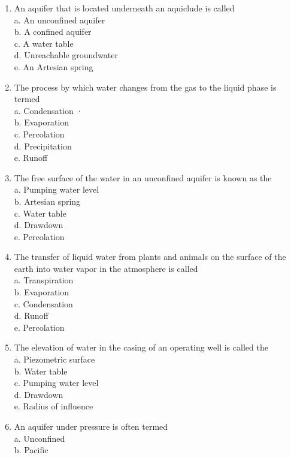 \begin{enumerate}[1.]
 \item An aquifer that is located underneath an aquiclude is called\\
 a. An unconfined aquifer\\
 b. A confined aquifer\\
 c. A water table\\
 d. Unreachable groundwater\\
 e. An Artesian spring\\
 \item The process by which water changes from the gas to the liquid phase is termed\\
 a. Condensation ·\\
 b. Evaporation\\
 c. Percolation\\
 d. Precipitation\\
 e. Runoff\\
 \item The free surface of the water in an unconfined aquifer is known as the\\
 a. Pumping water level\\
 b. Artesian spring\\
 c. Water table\\
 d. Drawdown\\
 e. Percolation\\
 \item The transfer of liquid water from plants and animals on the surface of the earth into water vapor in the atmosphere is called\\
 a. Transpiration\\
 b. Evaporation\\
 c. Condensation\\
 d. Runoff\\
 e. Percolation\\
 \item The elevation of water in the casing of an operating well is called the\\
 a. Piezometric surface\\
 b. Water table\\
 c. Pumping water level\\
 d. Drawdown\\
 e. Radius of influence\\
 \item An aquifer under pressure is often termed\\
 a. Unconfined\\
 b. Pacific\\

\end{enumerate}

